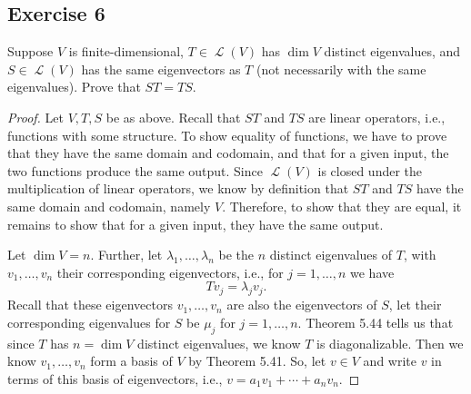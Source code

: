 \documentclass[letterpaper, 12pt]{amsart}
\DeclareMathOperator{\Ell}{\mathscr{L}}				%
\theoremstyle{definition}  							%
\begin{document}
		\subsection*{Exercise 6}
		Suppose $V$ is finite-dimensional, $T \in \Ell(V)$ has $\dim V$ distinct eigenvalues, and $S \in \Ell(V)$ has the same eigenvectors as $T$ (not necessarily with the same eigenvalues). 
		Prove that $ST = TS$.
		\vspace*{3mm}

		\begin{proof}
		Let $V,T,S$ be as above.
		Recall that $ST$ and $TS$ are linear operators, i.e., functions with some structure.
		To show equality of functions, we have to prove that they have the same domain and codomain, and that for a given input, the two functions produce the same output.
		Since $\Ell(V)$ is closed under the multiplication of linear operators, we know by definition that $ST$ and $TS$ have the same domain and codomain, namely $V$. Therefore, to show that they are equal, it remains to show that for a given input, they have the same output.

		Let $\dim V = n$.
		Further, let $\lambda_{1}, \dots, \lambda_{n}$ be the $n$ distinct eigenvalues of $T$, with $v_{1}, \dots, v_{n}$ their corresponding eigenvectors, i.e., for $j = 1,\dots,n$ we have $$Tv_{j} = \lambda_{j}v_{j}.$$
		Recall that these eigenvectors $v_{1}, \dots, v_{n}$ are also the eigenvectors of $S$, let their corresponding eigenvalues for $S$ be $\mu_{j}$ for $j=1,\dots,n$.
		Theorem 5.44 tells us that since $T$ has $n = \dim V$ distinct eigenvalues, we know $T$ is diagonalizable.
		Then we know $v_{1}, \dots, v_{n}$ form a basis of $V$ by Theorem 5.41. 
		So, let $v \in V$ and write $v$ in terms of this basis of eigenvectors, i.e., $v = a_{1}v_{1} + \cdots + a_{n}v_{n}$.


\end{proof}
\end{document}
